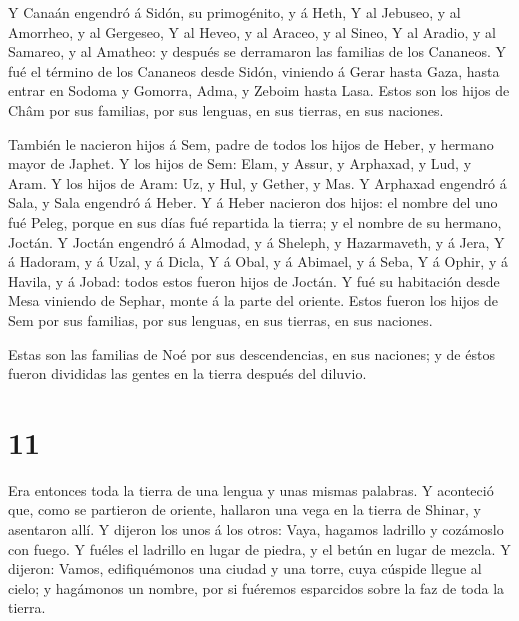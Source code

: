  Y Canaán engendró á Sidón, su primogénito, y á Heth,
 Y al Jebuseo, y al Amorrheo, y al Gergeseo, 
Y al Heveo, y al Araceo, y al Sineo,  Y al Aradio, y al
Samareo, y al Amatheo: y después se derramaron las familias de los
Cananeos.  Y fué el término de los Cananeos desde Sidón,
viniendo á Gerar hasta Gaza, hasta entrar en Sodoma y Gomorra, Adma, y
Zeboim hasta Lasa.  Estos son los hijos de Châm por sus
familias, por sus lenguas, en sus tierras, en sus naciones.

 También le nacieron hijos á Sem, padre de todos los hijos
de Heber, y hermano mayor de Japhet.  Y los hijos de Sem:
Elam, y Assur, y Arphaxad, y Lud, y Aram.  Y los hijos de
Aram: Uz, y Hul, y Gether, y Mas.  Y Arphaxad engendró á
Sala, y Sala engendró á Heber.  Y á Heber nacieron dos
hijos: el nombre del uno fué Peleg, porque en sus días fué repartida la
tierra; y el nombre de su hermano, Joctán.  Y Joctán
engendró á Almodad, y á Sheleph, y Hazarmaveth, y á Jera, 
Y á Hadoram, y á Uzal, y á Dicla,  Y á Obal, y á Abimael, y
á Seba,  Y á Ophir, y á Havila, y á Jobad: todos estos
fueron hijos de Joctán.  Y fué su habitación desde Mesa
viniendo de Sephar, monte á la parte del oriente.  Estos
fueron los hijos de Sem por sus familias, por sus lenguas, en sus
tierras, en sus naciones.

 Estas son las familias de Noé por sus descendencias, en
sus naciones; y de éstos fueron divididas las gentes en la tierra
después del diluvio.

\hypertarget{section-10}{%
\section{11}\label{section-10}}

 Era entonces toda la tierra de una lengua y unas mismas
palabras.  Y aconteció que, como se partieron de oriente,
hallaron una vega en la tierra de Shinar, y asentaron allí. 
Y dijeron los unos á los otros: Vaya, hagamos ladrillo y cozámoslo con
fuego. Y fuéles el ladrillo en lugar de piedra, y el betún en lugar de
mezcla.  Y dijeron: Vamos, edifiquémonos una ciudad y una
torre, cuya cúspide llegue al cielo; y hagámonos un nombre, por si
fuéremos esparcidos sobre la faz de toda la tierra.

